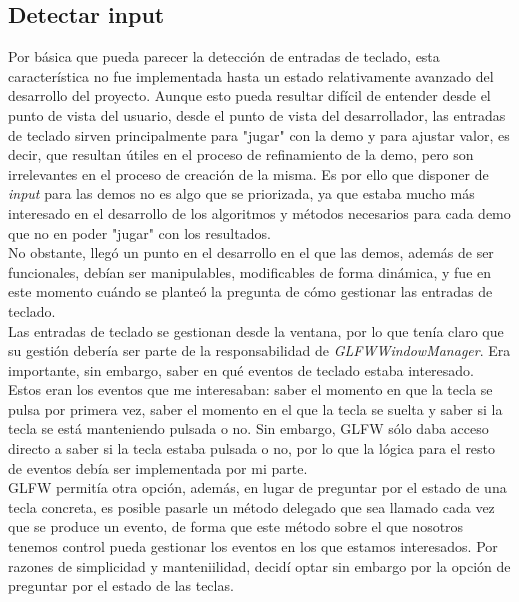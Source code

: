 \subsection{Detectar input}

Por básica que pueda parecer la detección de entradas de teclado, esta característica no fue implementada hasta un estado relativamente avanzado del desarrollo del proyecto. Aunque esto pueda resultar difícil de entender desde el punto de vista del usuario, desde el punto de vista del desarrollador, las entradas de teclado sirven principalmente para "jugar" con la demo y para ajustar valor, es decir, que resultan útiles en el proceso de refinamiento de la demo, pero son irrelevantes en el proceso de creación de la misma. Es por ello que disponer de \emph{input} para las demos no es algo que se priorizada, ya que estaba mucho más interesado en el desarrollo de los algoritmos y métodos necesarios para cada demo que no en poder "jugar" con los resultados.\\

No obstante, llegó un punto en el desarrollo en el que las demos, además de ser funcionales, debían ser manipulables, modificables de forma dinámica, y fue en este momento cuándo se planteó la pregunta de cómo gestionar las entradas de teclado.\\

Las entradas de teclado se gestionan desde la ventana, por lo que tenía claro que su gestión debería ser parte de la responsabilidad de \emph{GLFWWindowManager}. Era importante, sin embargo, saber en qué eventos de teclado estaba interesado.\\

Estos eran los eventos que me interesaban: saber el momento en que la tecla se pulsa por primera vez, saber el momento en el que la tecla se suelta y saber si la tecla se está manteniendo pulsada o no. Sin embargo, GLFW sólo daba acceso directo a saber si la tecla estaba pulsada o no, por lo que la lógica para el resto de eventos debía ser implementada por mi parte.\\

GLFW permitía otra opción, además, en lugar de preguntar por el estado de una tecla concreta, es posible pasarle un método delegado que sea llamado cada vez que se produce un evento, de forma que este método sobre el que nosotros tenemos control pueda gestionar los eventos en los que estamos interesados. Por razones de simplicidad y manteniilidad, decidí optar sin embargo por la opción de preguntar por el estado de las teclas.\\

